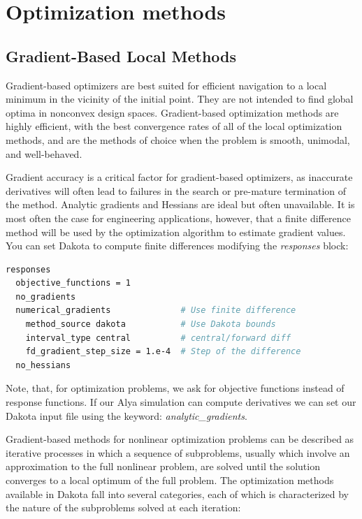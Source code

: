 \documentclass[12pt,a4paper,article]{memoir}
\begin{document}
\section{Optimization methods}
\subsection{Gradient-Based Local Methods}
Gradient-based optimizers are best suited for efficient navigation to a local minimum in the vicinity of the initial point. They are not intended to find global optima in nonconvex design spaces. Gradient-based optimization methods are highly efficient, with the best convergence rates of all of the local optimization methods, and are the methods of choice when the problem is smooth, unimodal, and well-behaved.

Gradient accuracy is a critical factor for gradient-based optimizers, as inaccurate derivatives will often lead to failures in the search or pre-mature termination of the method. Analytic gradients and Hessians are ideal but often unavailable. It is most often the case for engineering applications, however, that a finite difference method will be used by the optimization algorithm to estimate gradient values. You can set Dakota to compute finite differences modifying the \textit{responses} block:

\begin{lstlisting}[style=MyCodeStyle,language=bash]
responses
  objective_functions = 1
  no_gradients
  numerical_gradients              # Use finite difference
    method_source dakota           # Use Dakota bounds
    interval_type central          # central/forward diff
    fd_gradient_step_size = 1.e-4  # Step of the difference
  no_hessians
\end{lstlisting}

Note, that, for optimization problems, we ask for objective functions instead of response functions. If our Alya simulation can compute derivatives we can set our Dakota input file using the keyword: \textit{analytic\_gradients}.

Gradient-based methods for nonlinear optimization problems can be described as iterative processes in which a sequence of subproblems, usually which involve an approximation to the full nonlinear problem, are solved until the solution converges to a local optimum of the full problem. The optimization methods available in Dakota fall into several categories, each of which is characterized by the nature of the subproblems solved at each iteration:
\end{document}
